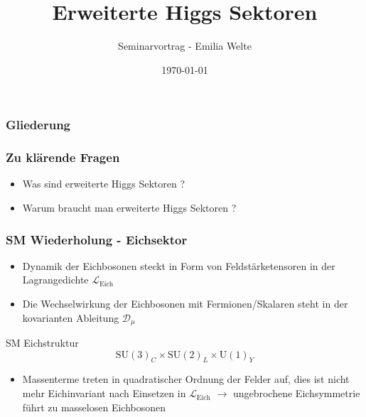 \documentclass{beamer}
\title{Erweiterte Higgs Sektoren}
\author{Seminarvortrag - Emilia Welte}
\date{ \today}
\makeatletter
\newcommand\listofframes{\@starttoc{lbf}}
\makeatother
\begin{document}
\begin{frame} 
\titlepage
\end{frame}


\begin{frame}
\frametitle{Gliederung}
\listofframes
\end{frame}

\begin{frame}
\frametitle{Zu klärende Fragen}
\begin{itemize}
\item Was sind erweiterte Higgs Sektoren ?
\item Warum braucht man erweiterte Higgs Sektoren ?
\end{itemize}
\end{frame}

\begin{frame}

\frametitle{SM Wiederholung - Eichsektor}
\begin{itemize}
\item Dynamik der Eichbosonen steckt in Form von Feldstärketensoren in der Lagrangedichte $\mathscr{L}_{\text{Eich}}$
\item Die Wechselwirkung der Eichbosonen mit Fermionen/Skalaren steht in der kovarianten Ableitung $\mathscr{D}_{\mu}$
\end{itemize}

\begin{block}{SM Eichstruktur}
\begin{equation}
\text{SU}(3)_{C}\times \text{SU}(2)_{L} \times \text{U}(1)_{Y} 
\end{equation}
\end{block}

\begin{itemize}
\item Massenterme treten in quadratischer Ordnung der Felder auf, dies ist nicht mehr Eichinvariant nach Einsetzen in $\mathscr{L}_{\text{Eich}}$ $\rightarrow$ ungebrochene Eichsymmetrie führt zu masselosen Eichbosonen
\end{itemize}

\end{frame}
\end{document}
